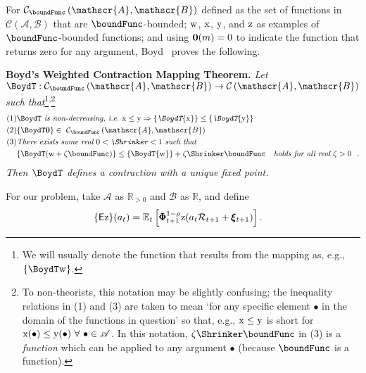 \documentclass[BufferStockTheory]{subfiles}
\begin{document}
For $\mathcal{C}_{\boundFunc }\left( \mathscr{A},\mathscr{B}\right) $ defined as the set of functions in $\mathcal{C}(\mathscr{A},\mathscr{B})$ that are $\boundFunc$-bounded; $\mathrm{w}$, $\mathrm{x}$, $\mathrm{y}$, and $\mathrm{z}$ as examples of $\boundFunc$-bounded functions; and using {$\mathbf{0}(m)=0$} to indicate the function that returns zero for any argument, Boyd~\citeyearpar{jboydWeighted} proves the following.

\textbf{Boyd's Weighted Contraction Mapping Theorem.} \textit{Let $\BoydT:\mathcal{C}_{\boundFunc }\left( \mathscr{A},\mathscr{B}\right)
  \rightarrow \mathcal{C}\left( \mathscr{A},\mathscr{B}\right) $ such
  that}\footnote{We will usually denote the function that results from the mapping as, e.g., $\{\BoydT\wFunc\}$.}\textsuperscript{,}\footnote{To non-theorists, this notation may be slightly confusing; the inequality relations in (1) and (3) are taken to mean `for any specific element $\bullet$ in the domain of the functions in question' so that, e.g., $\mathrm{x} \leq \mathrm{y}$ is short for $\mathrm{x}(\bullet) \leq \mathrm{y}(\bullet)~\forall~\bullet\in \mathscr{A}$.  In this notation, $\zeta \Shrinker \boundFunc$ in (3) is a \textit{function} which can be applied to any argument $\bullet$ (because $\boundFunc$ is a function).} \nopagebreak
\begin{align*}
  \mbox{(1)} &\BoydT%
               \mbox{ \textit{is non-decreasing, i.e.\ ${\xFunc} \leq {\yFunc}\Rightarrow
               \{\BoydT{\xFunc}\} \leq \{\BoydT{\yFunc}\}$}}   \nonumber \\
  \mbox{(2)} & \{\BoydT\mathbf{0}\}\in ~ \mathcal{C}_{\boundFunc }\left(\mathscr{A},\mathscr{B}\right)  \notag \\
  \mbox{(3)}
             & \mbox{\textit{There exists some real $0 < \Shrinker < 1$ such that}} \\
             & \{\BoydT({\wFunc} +\zeta\boundFunc )\} \leq \{\BoydT{\wFunc}\} +\zeta\Shrinker \boundFunc
               \mbox{ \textit{~~holds for all real $\zeta > 0$ } } .
\end{align*}
\textit{Then $\BoydT$ defines a contraction with a unique fixed point.}

For our problem, take $\mathscr{A}$ as $\mathbb{R}_{>0}$ and $\mathscr{B}$
as $\mathbb{R}$, and define
\begin{align*}
  \{\mathsf{E} \mathrm{z}\}(a_{t})  & = {\mathbb{E}}_{t}\left[\pmb{\Phi}^{1-{\rho}}_{t+1} \mathrm{z}(a_{t} \mathcal{R}_{t+1} + \pmb{\xi}_{t+1})\right].
\end{align*}
\end{document}

